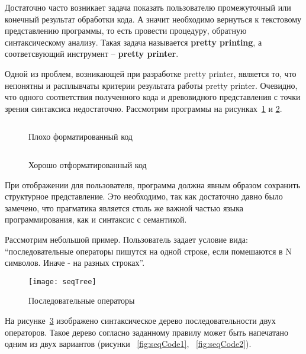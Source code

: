 Достаточно часто возникает задача показать пользователю промежуточный или конечный результат обработки кода.
А значит необходимо вернуться к текстовому представлению программы, то есть провести процедуру, обратную синтаксическому анализу. Такая задача называется \textbf{pretty printing}, а соответсвующий инструмент -- \textbf{pretty printer}.

Одной из проблем, возникающей при разработке pretty printer, является то, что непонятны и расплывчаты критерии результата работы pretty printer.
Очевидно, что одного соответствия полученного кода и древовидного представления с точки зрения синтаксиса недостаточно. Рассмотрим программы на рисунках~\ref{fig:wikiExUnfor} и \ref{fig:wikiExBSD}.

\begin{figure}[h!]
	\centering
	\inputminted{c}{codes/wikiExUnfor.c}
	\caption{Плохо форматированный код}
	\label{fig:wikiExUnfor}
\end{figure}

\begin{figure}[h!]
	\centering
	\inputminted{c}{codes/wikiExBSD.c}
	\caption{Хорошо отформатированный код}
	\label{fig:wikiExBSD}
\end{figure}

При отображении для пользователя, программа должна явным образом сохранить структурное представление.
Это необходимо, так как достаточно давно было замечено, что прагматика является столь же важной частью языка программирования, как и синтаксис с семантикой.


Рассмотрим небольшой пример. Пользователь задает условие вида: “последовательные операторы пишутся на одной строке, если помешаются в N символов. Иначе - на разных строках”.


\begin{figure}[h]
	\centering
	\texttt{[image: seqTree]}
	\caption{Последовательные операторы}
	\label{fig:seqImage}
\end{figure}

На рисунке~\ref{fig:seqImage} изображено синтаксическое дерево последовательности двух операторов. Такое дерево согласно заданному правилу может быть напечатано одним из двух вариантов (рисунки ~\ref{fig:seqCode1}, ~\ref{fig:seqCode2}).

